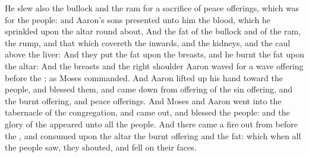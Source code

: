 \begin{biblechapter}
\verse He slew also the bullock and the ram for a sacrifice of peace offerings, which was for the people: and Aaron's sons presented unto him the blood, which he sprinkled upon the altar round about,
\verse And the fat of the bullock and of the ram, the rump, and that which covereth the inwards, and the kidneys, and the caul above the liver:
\verse And they put the fat upon the breasts, and he burnt the fat upon the altar:
\verse And the breasts and the right shoulder Aaron waved for a wave offering before the \LORD; as Moses commanded.
\verse And Aaron lifted up his hand toward the people, and blessed them, and came down from offering of the sin offering, and the burnt offering, and peace offerings.
\verse And Moses and Aaron went into the tabernacle of the congregation, and came out, and blessed the people: and the glory of the \LORD appeared unto all the people.
\verse And there came a fire out from before the \LORD, and consumed upon the altar the burnt offering and the fat: which when all the people saw, they shouted, and fell on their faces.
\end{biblechapter}

